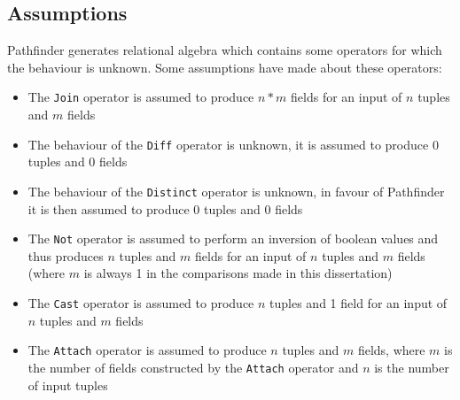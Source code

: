 \subsection{Assumptions}
Pathfinder generates relational algebra which contains some operators for which
the behaviour is unknown. Some assumptions have made about these operators:
\begin{itemize}
  \item The \texttt{Join} operator is assumed to produce $n*m$ fields for an
  input of $n$ tuples and $m$ fields
  \item The behaviour of the \texttt{Diff} operator is unknown, it is assumed
  to produce 0 tuples and 0 fields
  \item The behaviour of the \texttt{Distinct} operator is unknown, in favour
  of Pathfinder it is then assumed to produce 0 tuples and 0 fields
  \item The \texttt{Not} operator is assumed to perform an inversion of boolean
  values and thus produces $n$ tuples and $m$ fields for an input of $n$ tuples
  and $m$ fields (where $m$ is always 1 in the comparisons made in this dissertation)
  \item The \texttt{Cast} operator is assumed to produce $n$ tuples and 1
  field for an input of $n$ tuples and $m$ fields
  \item The \texttt{Attach} operator is assumed to produce $n$ tuples and $m$
  fields, where $m$ is the number of fields constructed by the \texttt{Attach}
  operator and $n$ is the number of input tuples
\end{itemize}